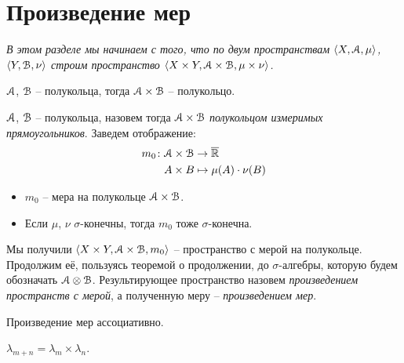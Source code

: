 \section{Произведение мер}

\textit{В этом разделе мы начинаем с того, что по двум пространствам
$\langle X, \mathcal{A}, \mu \rangle$, $\langle Y, \mathcal{B}, \nu \rangle$ строим пространство
$\langle X \times Y, \mathcal{A} \times \mathcal{B}, \mu \times \nu \rangle$.}

\begin{lemma}
    $\mathcal{A}$, $\mathcal{B}$ -- полукольца, тогда $\mathcal{A} \times \mathcal{B}$ -- полукольцо.
\end{lemma}

\begin{definition}
    $\mathcal{A}$, $\mathcal{B}$ -- полукольца, назовем тогда $\mathcal{A} \times \mathcal{B}$ \textit{полукольцом
    измеримых прямоугольников}. Заведем отображение:
\begin{align*}
    m_0 \colon &\mathcal{A} \times \mathcal{B} \to \overline{\mathbb{R}} \\
               &A \times B \mapsto \mu(A) \cdot \nu(B)
\end{align*}
\end{definition}

\begin{theorem}
    \enewline
    \begin{itemize}
        \item $m_0$ -- мера на полукольце $\mathcal{A} \times \mathcal{B}$.
        \item Если $\mu$, $\nu$ $\sigma$-конечны, тогда $m_0$ тоже $\sigma$-конечна.
    \end{itemize} 
\end{theorem}

\begin{definition}

    Мы получили $\langle X \times Y, \mathcal{A} \times \mathcal{B}, m_0 \rangle$ -- пространство с
    мерой на полукольце. Продолжим её, пользуясь теоремой о продолжении,
    до $\sigma$-алгебры, которую будем обозначать $\mathcal{A} \otimes \mathcal{B}$. Результирующее пространство
    назовем \textit{произведением пространств с мерой}, а полученную меру -- \textit{произведением мер}.
\end{definition}

\begin{theorem}
    Произведение мер ассоциативно.
\end{theorem}

\begin{theorem}
    $\lambda_{m + n} = \lambda_{m} \times \lambda_{n}$.
\end{theorem}

